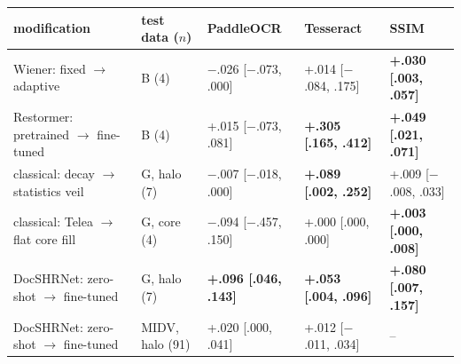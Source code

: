 \begin{tabular}{lllll}
\toprule
modification & test data ($n$) & PaddleOCR & Tesseract & SSIM \\
\midrule
Wiener: fixed $\rightarrow$ adaptive & B (4) & $-$.026 [$-$.073, .000] & +.014 [$-$.084, .175] & \textbf{+.030 [.003, .057]} \\
Restormer: pretrained $\rightarrow$ fine-tuned & B (4) & +.015 [$-$.073, .081] & \textbf{+.305 [.165, .412]} & \textbf{+.049 [.021, .071]} \\
classical: decay $\rightarrow$ statistics veil & G, halo (7) & $-$.007 [$-$.018, .000] & \textbf{+.089 [.002, .252]} & +.009 [$-$.008, .033] \\
classical: Telea $\rightarrow$ flat core fill & G, core (4) & $-$.094 [$-$.457, .150] & +.000 [.000, .000] & \textbf{+.003 [.000, .008]} \\
DocSHRNet: zero-shot $\rightarrow$ fine-tuned & G, halo (7) & \textbf{+.096 [.046, .143]} & \textbf{+.053 [.004, .096]} & \textbf{+.080 [.007, .157]} \\
DocSHRNet: zero-shot $\rightarrow$ fine-tuned & MIDV, halo (91) & +.020 [.000, .041] & +.012 [$-$.011, .034] & -- \\
\bottomrule
\end{tabular}
